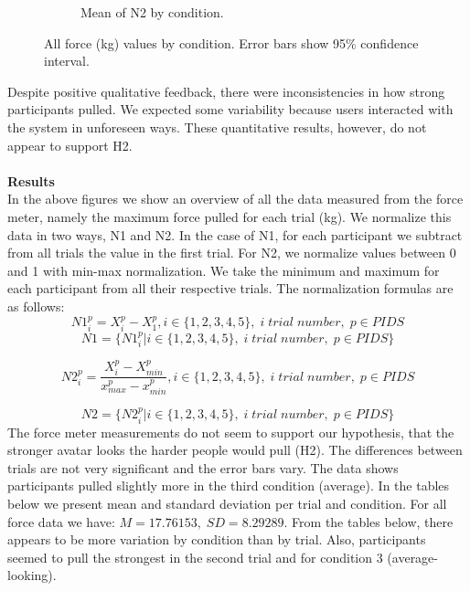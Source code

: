 \begin{figure}[H]
\begin{subfigure}[b]{0.4\textwidth}
         \caption{Mean of N2 by condition.}
         \label{fig:meanN2Cond}
     \end{subfigure} 
      \caption{All force (kg) values by condition. Error bars show 95\%  confidence interval.}
         \label{fig:allForceCond}
\end{figure} 
 Despite positive qualitative feedback, there were inconsistencies in how strong participants pulled. We expected some variability because users interacted with the system in unforeseen ways. These quantitative results, however, do not appear to support H2.\\
 \\
\textbf{Results}\\
In the above figures we show an overview of all the data measured from the force meter, namely the maximum force pulled for each trial (kg). We normalize this data in two ways, N1 and N2. In the case of N1, for each participant we subtract from all trials the value in the first trial. For N2, we normalize values between 0 and 1 with min-max normalization. We take the minimum and maximum for each participant from all their respective trials. The normalization formulas are as follows: 
\[ N1_i^p=X_i^p-X_1^p, i \in \{1,2,3,4,5\},\; i \; trial \; number,\; p \in PIDS \]
\[N1= \{ N1_i^p |  i \in \{1,2,3,4,5\},\; i \; trial \; number,\; p \in PIDS \}  \]

\[ N2_i^p=\frac{X_i^p-X_{min}^p}{x_{max}^p-x_{min}^p} , i \in \{1,2,3,4,5\},\; i \; trial \; number,\; p \in PIDS\]

\[N2= \{ N2_i^p |  i \in \{1,2,3,4,5\},\; i \; trial \; number,\; p \in PIDS \}  \]
The force meter measurements do not seem to support our hypothesis, that the stronger avatar looks the harder people would pull (H2). The differences between trials are not very significant and the error bars vary. The data shows participants pulled slightly more in the third condition (average). In the tables below we present mean and standard deviation per trial and condition. For all force data we have: $M= 17.76153, \; SD=8.29289$.
From the tables below, there appears to be more variation by condition than by trial. Also, participants seemed to pull the strongest in the second trial and for condition 3 (average-looking).

